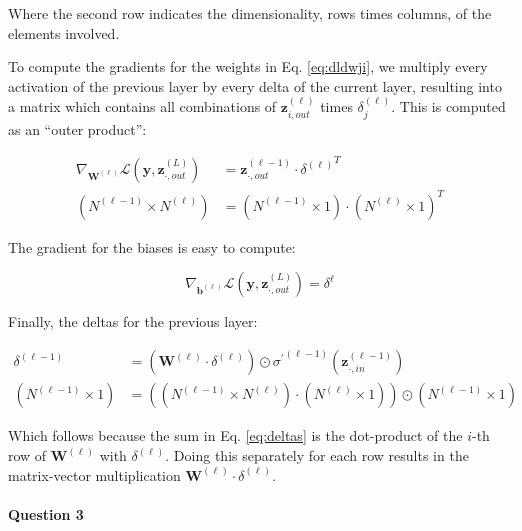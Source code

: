 \documentclass[
  a4paper,
]{article}
\begin{document}
Where the second row indicates the dimensionality, rows times columns,
of the elements involved.

To compute the gradients for the weights in Eq. \ref{eq:dldwji}, we
multiply every activation of the previous layer by every delta of the
current layer, resulting into a matrix which contains all combinations
of \(\textbf{z}^{(\ell)}_{i,out}\) times \(\delta^{(\ell)}_j\). This is
computed as an ``outer product'':

\begin{equation}
\label{eq:gradw}
\begin{aligned}
\nabla_{\textbf{W}^{(\ell)}}\mathcal{L}(\textbf{y},\textbf{z}^{(L)}_{\cdot,out})&=\textbf{z}^{(\ell-1)}_{\cdot,out}\cdot{\delta^{(\ell)}}^T \\
(N^{(\ell-1)}\times N^{(\ell)})&=(N^{(\ell-1)}\times 1)\cdot (N^{(\ell)}\times 1)^T
\end{aligned}
\end{equation}

The gradient for the biases is easy to compute:

\begin{equation}
\nabla_{\textbf{b}^{(\ell)}}\mathcal{L}(\textbf{y},\textbf{z}^{(L)}_{\cdot,out})=\delta^\ell
\end{equation}

Finally, the deltas for the previous layer:

\begin{equation}
\begin{aligned}
\label{eq:deltasvec}
\delta^{(\ell-1)}&=\left(\textbf{W}^{(\ell)}\cdot\delta^{(\ell)}\right)
\odot{\sigma^\prime}^{(\ell-1)}(\textbf{z}^{(\ell-1)}_{\cdot,in}) \\
(N^{(\ell-1)}\times 1)&=\left(
(N^{(\ell-1)}\times N^{(\ell)})\cdot(N^{(\ell)}\times 1)
\right)\odot(N^{(\ell-1)}\times 1)
\end{aligned}
\end{equation}

Which follows because the sum in Eq. \ref{eq:deltas} is the dot-product
of the \(i\)-th row of \(\textbf{W}^{(\ell)}\) with \(\delta^{(\ell)}\).
Doing this separately for each row results in the matrix-vector
multiplication \(\textbf{W}^{(\ell)}\cdot\delta^{(\ell)}\).

\hypertarget{question-3}{%
\paragraph{Question 3}\label{question-3}}
\end{document}
